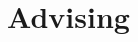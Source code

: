 \documentclass[10pt,letterpaper]{article}
\renewenvironment{itemize}{
  \begin{list}{}{
      \setlength{\leftmargin}{1.5em}
      \setlength{\itemsep}{0.25em}
      \setlength{\parskip}{0pt}
      \setlength{\parsep}{0.25em}
    }
}{
  \end{list}
}
\begin{document}
%

\section*{Advising}

%
\end{document}
